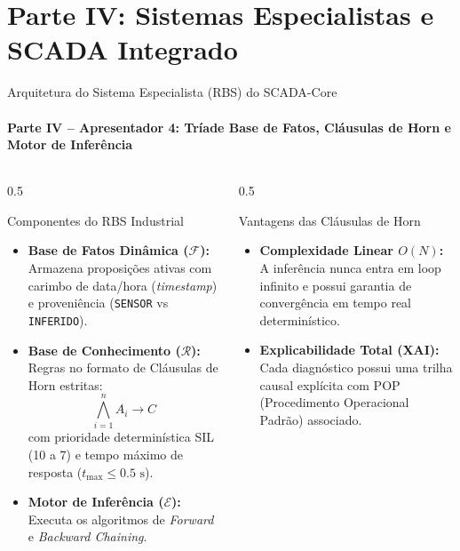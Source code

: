 \documentclass[aspectratio=169, 10pt]{beamer}
\begin{document}
\section{Parte IV: Sistemas Especialistas e SCADA Integrado}

\begin{frame}{Arquitetura do Sistema Especialista (RBS) do SCADA-Core}
  \framesubtitle{Parte IV -- Apresentador 4: Tríade Base de Fatos, Cláusulas de Horn e Motor de Inferência}
  \begin{columns}
    \begin{column}{0.5\textwidth}
      \begin{block}{Componentes do RBS Industrial}
        \begin{itemize}
          \item \textbf{Base de Fatos Dinâmica ($\mathcal{F}$):}
          Armazena proposições ativas com carimbo de data/hora (\textit{timestamp}) e proveniência (\texttt{SENSOR} vs \texttt{INFERIDO}).
          \item \textbf{Base de Conhecimento ($\mathcal{R}$):}
          Regras no formato de Cláusulas de Horn estritas:
          $$\bigwedge_{i=1}^n A_i \longrightarrow C$$
          com prioridade determinística SIL (10 a 7) e tempo máximo de resposta ($t_{\text{max}} \le 0.5\text{ s}$).
          \item \textbf{Motor de Inferência ($\mathcal{E}$):}
          Executa os algoritmos de \textit{Forward} e \textit{Backward Chaining}.
        \end{itemize}
      \end{block}
    \end{column}

    \begin{column}{0.5\textwidth}
      \begin{exampleblock}{Vantagens das Cláusulas de Horn}
        \begin{itemize}
          \item \textbf{Complexidade Linear $O(N)$:}
          A inferência nunca entra em loop infinito e possui garantia de convergência em tempo real determinístico.
          \item \textbf{Explicabilidade Total (XAI):}
          Cada diagnóstico possui uma trilha causal explícita com POP (Procedimento Operacional Padrão) associado.
        \end{itemize}
      \end{exampleblock}
    \end{column}
  \end{columns}
\end{frame}
\end{document}
